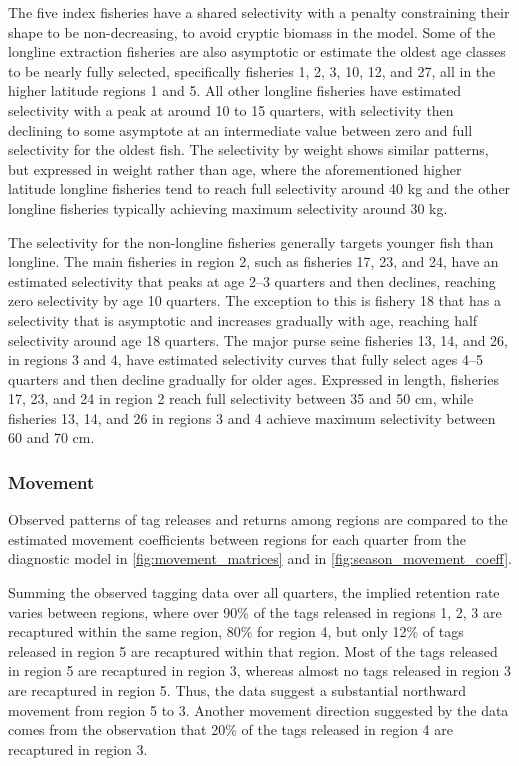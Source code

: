 The five index fisheries have a shared selectivity with a penalty constraining their shape to be non-decreasing, to avoid cryptic biomass in the model. Some of the longline extraction fisheries are also asymptotic or estimate the oldest age classes to be nearly fully selected, specifically fisheries 1, 2, 3, 10, 12, and 27, all in the higher latitude regions 1 and 5. All other longline fisheries have estimated selectivity with a peak at around 10 to 15 quarters, with selectivity then declining to some asymptote at an intermediate value between zero and full selectivity for the oldest fish. The selectivity by weight shows similar patterns, but expressed in weight rather than age, where the aforementioned higher latitude longline fisheries tend to reach full selectivity around 40 kg and the other longline fisheries typically achieving maximum selectivity around 30 kg.

The selectivity for the non-longline fisheries generally targets younger fish than longline. The main fisheries in region 2, such as fisheries 17, 23, and 24, have an estimated selectivity that peaks at age 2--3 quarters and then declines, reaching zero selectivity by age 10 quarters. The exception to this is fishery 18 that has a selectivity that is asymptotic and increases gradually with age, reaching half selectivity around age 18 quarters. The major purse seine fisheries 13, 14, and 26, in regions 3 and 4, have estimated selectivity curves that fully select ages 4--5 quarters and then decline gradually for older ages. Expressed in length, fisheries 17, 23, and 24 in region 2 reach full selectivity between 35 and 50 cm, while fisheries 13, 14, and 26 in regions 3 and 4 achieve maximum selectivity between 60 and 70 cm.

\subsubsection{Movement}
\label{sec:movement}

Observed patterns of tag releases and returns among regions are compared to the estimated movement coefficients between regions for each quarter from the diagnostic model in \autoref{fig:movement_matrices} and in \autoref{fig:season_movement_coeff}.

Summing the observed tagging data over all quarters, the implied retention rate varies between regions, where over 90\% of the tags released in regions 1, 2, 3 are recaptured within the same region, 80\% for region 4, but only 12\% of tags released in region 5 are recaptured within that region. Most of the tags released in region 5 are recaptured in region 3, whereas almost no tags released in region 3 are recaptured in region 5. Thus, the data suggest a substantial northward movement from region 5 to 3. Another movement direction suggested by the data comes from the observation that 20\% of the tags released in region 4 are recaptured in region 3.

